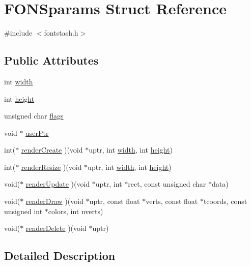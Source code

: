 \hypertarget{struct_f_o_n_sparams}{\section{F\+O\+N\+Sparams Struct Reference}
\label{struct_f_o_n_sparams}
}


{\ttfamily \#include $<$fontstash.\+h$>$}

\subsection*{Public Attributes}
\begin{DoxyCompactItemize}
\item 
int \hyperlink{struct_f_o_n_sparams_aac83f900d8d0d99db419facda30dd9d2}{width}
\item 
int \hyperlink{struct_f_o_n_sparams_a938b4ebdbc1734625b57f801b830758b}{height}
\item 
unsigned char \hyperlink{struct_f_o_n_sparams_a1fedd9cf05c88dc089a76e4a94f4dec0}{flags}
\item 
void $\ast$ \hyperlink{struct_f_o_n_sparams_a3a6a794c1b7b473d0ac6beb232a8f1e9}{user\+Ptr}
\item 
int($\ast$ \hyperlink{struct_f_o_n_sparams_a92d9a5443b3694c2a698e12a41720616}{render\+Create} )(void $\ast$uptr, int \hyperlink{struct_f_o_n_sparams_aac83f900d8d0d99db419facda30dd9d2}{width}, int \hyperlink{struct_f_o_n_sparams_a938b4ebdbc1734625b57f801b830758b}{height})
\item 
int($\ast$ \hyperlink{struct_f_o_n_sparams_ad3fc02cf5846a215e7b23f583681e06a}{render\+Resize} )(void $\ast$uptr, int \hyperlink{struct_f_o_n_sparams_aac83f900d8d0d99db419facda30dd9d2}{width}, int \hyperlink{struct_f_o_n_sparams_a938b4ebdbc1734625b57f801b830758b}{height})
\item 
void($\ast$ \hyperlink{struct_f_o_n_sparams_aceb5385a77ddcfb142909967a0d120e7}{render\+Update} )(void $\ast$uptr, int $\ast$rect, const unsigned char $\ast$data)
\item 
void($\ast$ \hyperlink{struct_f_o_n_sparams_ade57583dd6f18eada98763a4f1817bf9}{render\+Draw} )(void $\ast$uptr, const float $\ast$verts, const float $\ast$tcoords, const unsigned int $\ast$colors, int nverts)
\item 
void($\ast$ \hyperlink{struct_f_o_n_sparams_ac375908ec6a8963c5893c0066df4d157}{render\+Delete} )(void $\ast$uptr)
\end{DoxyCompactItemize}


\subsection{Detailed Description}


